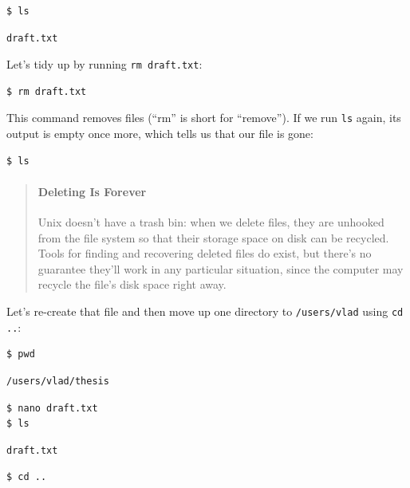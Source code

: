 \documentclass[]{book}
\begin{document}
\begin{verbatim}
$ ls
\end{verbatim}

\begin{verbatim}
draft.txt
\end{verbatim}

Let's tidy up by running \texttt{rm draft.txt}:

\begin{verbatim}
$ rm draft.txt
\end{verbatim}

This command removes files (``rm'' is short for ``remove''). If we run
\texttt{ls} again, its output is empty once more, which tells us that
our file is gone:

\begin{verbatim}
$ ls
\end{verbatim}

\begin{quote}
\mbox{}\paragraph{Deleting Is Forever}

Unix doesn't have a trash bin: when we delete files, they are unhooked
from the file system so that their storage space on disk can be
recycled. Tools for finding and recovering deleted files do exist, but
there's no guarantee they'll work in any particular situation, since the
computer may recycle the file's disk space right away.
\end{quote}

Let's re-create that file and then move up one directory to
\texttt{/users/vlad} using \texttt{cd ..}:

\begin{verbatim}
$ pwd
\end{verbatim}

\begin{verbatim}
/users/vlad/thesis
\end{verbatim}

\begin{verbatim}
$ nano draft.txt
$ ls
\end{verbatim}

\begin{verbatim}
draft.txt
\end{verbatim}

\begin{verbatim}
$ cd ..
\end{verbatim}
\end{document}
